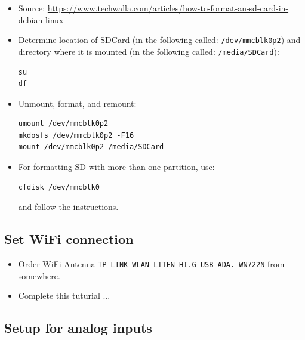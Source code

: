 \documentclass[
	fontsize=10pt
	paper=a4
]{scrartcl}
\begin{document}
\begin{itemize}
\item Source: \url{https://www.techwalla.com/articles/how-to-format-an-sd-card-in-debian-linux}

\item Determine location of SDCard (in the following called: \texttt{/dev/mmcblk0p2}) and directory where it is mounted (in the following called: \texttt{/media/SDCard}):
\begin{lstlisting}
su
df
\end{lstlisting}

\item Unmount, format, and remount:
\begin{lstlisting}
umount /dev/mmcblk0p2
mkdosfs /dev/mmcblk0p2 -F16
mount /dev/mmcblk0p2 /media/SDCard
\end{lstlisting}

\item For formatting SD with more than one partition, use:
\begin{lstlisting}
cfdisk /dev/mmcblk0
\end{lstlisting}
and follow the instructions.
\end{itemize}



\subsection{Set WiFi connection}

\begin{itemize}

\item Order WiFi Antenna \texttt{TP-LINK WLAN LITEN HI.G USB ADA. WN722N} from somewhere.

\item Complete this tuturial ...

\end{itemize}



\subsection{Setup for analog inputs}
\end{document}
